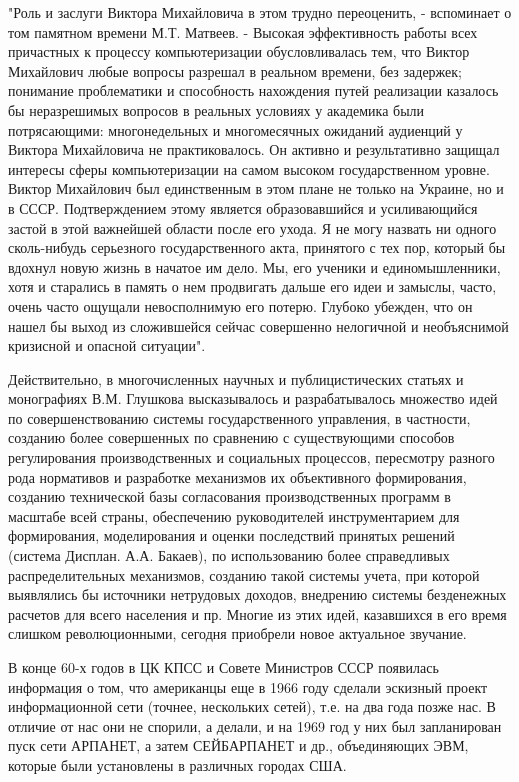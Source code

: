 \documentclass{article}
\begin{document}
"Роль и заслуги Виктора Михайловича в этом трудно переоценить, - вспоминает о
том памятном времени М.Т. Матвеев. - Высокая эффективность работы всех
причастных к процессу компьютеризации обусловливалась тем, что Виктор Михайлович
любые вопросы разрешал в реальном времени, без задержек; понимание проблематики
и способность нахождения путей реализации казалось бы неразрешимых вопросов в
реальных условиях у академика были потрясающими: многонедельных и многомесячных
ожиданий аудиенций у Виктора Михайловича не практиковалось. Он активно и
результативно защищал интересы сферы компьютеризации на самом высоком
государственном уровне. Виктор Михайлович был единственным в этом плане не
только на Украине, но и в СССР. Подтверждением этому является образовавшийся и
усиливающийся застой в этой важнейшей области после его ухода. Я не могу назвать
ни одного сколь-нибудь серьезного государственного акта, принятого с тех пор,
который бы вдохнул новую жизнь в начатое им дело. Мы, его ученики и
единомышленники, хотя и старались в память о нем продвигать дальше его идеи и
замыслы, часто, очень часто ощущали невосполнимую его потерю. Глубоко убежден,
что он нашел бы выход из сложившейся сейчас совершенно нелогичной и необъяснимой
кризисной и опасной ситуации".

Действительно, в многочисленных научных и публицистических статьях и монографиях
В.М. Глушкова высказывалось и разрабатывалось множество идей по
совершенствованию системы государственного управления, в частности, созданию
более совершенных по сравнению с существующими способов регулирования
производственных и социальных процессов, пересмотру разного рода нормативов и
разработке механизмов их объективного формирования, созданию технической базы
согласования производственных программ в масштабе всей страны, обеспечению
руководителей инструментарием для формирования, моделирования и оценки
последствий принятых решений (система Дисплан. А.А. Бакаев), по использованию
более справедливых распределительных механизмов, созданию такой системы учета,
при которой выявлялись бы источники нетрудовых доходов, внедрению системы
безденежных расчетов для всего населения и пр. Многие из этих идей, казавшихся в
его время слишком революционными, сегодня приобрели новое актуальное звучание.

В конце 60-х годов в ЦК КПСС и Совете Министров СССР появилась информация о том,
что американцы еще в 1966 году сделали эскизный проект информационной сети
(точнее, нескольких сетей), т.е. на два года позже нас. В отличие от нас они не
спорили, а делали, и на 1969 год у них был запланирован пуск сети АРПАНЕТ, а
затем СЕЙБАРПАНЕТ и др., объединяющих ЭВМ, которые были установлены в различных
городах США.
\end{document}
